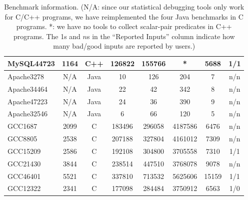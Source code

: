 \begin{table*}
\begin{tabular}{lccccccc}
    MySQL44723       & 1164        & C++              & 126822         & 155766        & *                & 5688          & 1/1            \\
    \midrule
    Apache3278       & N/A         & Java             & 10             & 126           & 204                & 7             & n/n           \\
    Apache34464      & N/A         & Java             & 22             & 42            & 342                & 8             & n/n           \\
    Apache47223      & N/A         & Java             & 24             & 36            & 390                & 9             & n/n           \\
    Apache32546      & N/A         & Java             & 6              & 66            & 120                & 5             & n/n           \\
    \midrule
    GCC1687          & 2099        & C                &  183496 & 296058 & 4187586 & 6476     & n/n            \\
    GCC8805          & 2538        & C                &  207188 & 327804 & 4161012 & 7309     & n/n            \\
    GCC15209         & 2586        & C                &  192108 & 304800 & 3705558 & 7310     & 1/1            \\
    GCC21430         & 3844        & C                &  238514 & 447510 & 3768078 & 9078     & n/n            \\
    GCC46401         & 5521        & C                &  337810 & 713532 & 5625606 & 15159    & 1/1            \\
    GCC12322         & 2341        & C                &  177098 & 284484 & 3750912 & 6563     & 1/0            \\
    \bottomrule
   \end{tabular}
  \nocaptionrule
  \caption{Benchmark information. (N/A: since our statistical debugging tools 
      only work for C/C++ programs, we have 
	reimplemented the four Java benchmarks in C programs. *: we have no
	tools to collect scalar-pair predicates in C++ programs. 
	The 1s and $n$s in the
	``Reported Inputs'' column indicate how many bad/good inputs are reported
	by users.)}
  \label{tab:benchmarks}
\end{table*}

